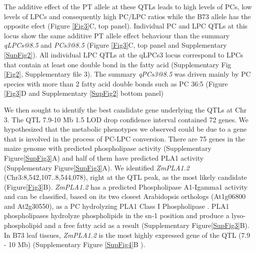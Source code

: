 \documentclass[9pt,twocolumn,twoside,lineno]{BioRxiv}
\begin{document}
The additive effect of the PT allele at these QTLs leads to high levels of PCs, low levels of LPCs and consequently high PC/LPC ratios while the B73 allele has the opposite efect (Figure \ref{Fig3}C, top panel).
Individual PC and LPC QTLs at this locus show the same additive PT allele effect behaviour than the summary \textit{qLPCs@8.5} and \textit{PCs3@8.5} (Figure \ref{Fig3}C, top panel and Supplementary \ref{SupFig2}).
All individual LPC QTLs at the qLPCs3 locus correspond to LPCs that contain at least one double bond in the fatty acid (Supplementary Fig \ref{Fig2}, Supplementary file 3).
The summary \textit{qPCs3@8.5} was driven mainly by PC species with more than 2 fatty acid double bonds such as PC 36:5 (Figure \ref{Fig3}D and Supplementary \ref{SupFig2} bottom panel)

We then sought to identify the best candidate gene underlying the QTLs at Chr 3.
The QTL 7.9-10 Mb 1.5 LOD drop confidence interval contained 72 genes. 
We hypothesized that the metabolic phenotypes we observed could be due to a gene that is involved in the process of PC-LPC conversion.  
There are 75 genes in the maize genome with predicted phospholipase activity (Supplementary Figure\ref{SupFig3}A) and half of them have predicted PLA1 activity (Supplementary Figure\ref{SupFig3}A).  
We identified \textit{ZmPLA1.2} (Chr3:8,542,107..8,544,078), right at the QTL peak, as the most likely candidate (Figure\ref{Fig3}B). 
\textit{ZmPLA1.2} has a predicted Phospholipase A1-Igamma1 activity and can be classified, based on its two closest Arabidopsis orthologs (At1g06800 and At2g30550), as a PC hydrolyzing PLA1 Class I Phospholipase \cite{Ryu2004-iv}. 
PLA1 phospholipases hydrolyze phospholipids in the sn-1 position and produce a lyso-phospholipid and a free fatty acid as a result (Supplementary Figure\ref{SupFig3}B). 
In B73 leaf tissues, \textit{ZmPLA1.2} is the most highly expressed gene of the QTL (7.9 - 10 Mb) (Supplementary Figure \ref{SupFig4}B \cite{Stelpflug2016-vr}).
\end{document}

